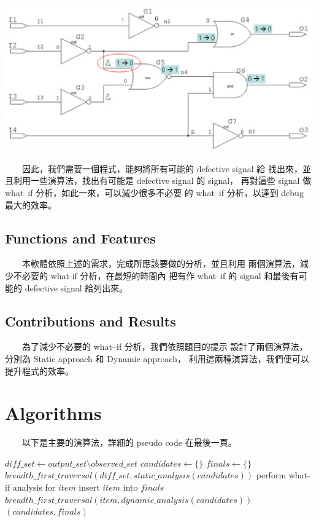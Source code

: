 \documentclass[12pt,a4paper]{article}
\begin{document}
\begin{center}
\includegraphics[scale=0.6]{imgs/02.eps}
\end{center}

　　因此，我們需要一個程式，能夠將所有可能的 defective signal 給%
找出來，並且利用一些演算法，找出有可能是 defective signal 的 signal，%
再對這些 signal 做 what–if 分析，如此一來，可以減少很多不必要%
的 what–if 分析，以達到 debug 最大的效率。

\subsection{Functions and Features}

　　本軟體依照上述的需求，完成所應該要做的分析，並且利用%
兩個演算法，減少不必要的 what-if 分析，在最短的時間內%
把有作 what–if 的 signal 和最後有可能的 defective signal 給列出來。%

\subsection{Contributions and Results}

　　為了減少不必要的 what–if 分析，我們依照題目的提示%
設計了兩個演算法，分別為 Static approach 和 Dynamic approach，%
利用這兩種演算法，我們便可以提升程式的效率。

\section{Algorithms}

　　以下是主要的演算法，詳細的 pseudo code 在最後一頁。

{\linespread{1}

\begin{algorithm}
\caption{$analysis(output\_set, observed\_set)$}
\begin{algorithmic}[1]
\STATE $diff\_set \leftarrow output\_set \setminus observed\_set$
\STATE $candidates \leftarrow \{\}$
\STATE $finals \leftarrow \{\}$
\STATE $breadth\_first\_traversal(diff\_set, static\_analysis(candidates))$
    \STATE perform what-if analysis for $item$
        \STATE insert $item$ into $finals$
    \ELSE
        \STATE $breadth\_first\_traversal(item, dynamic\_analysis(candidates))$
    \ENDIF
\ENDFOR
\RETURN $(candidates, finals)$
\end{algorithmic}
\end{algorithm}

}
\end{document}
